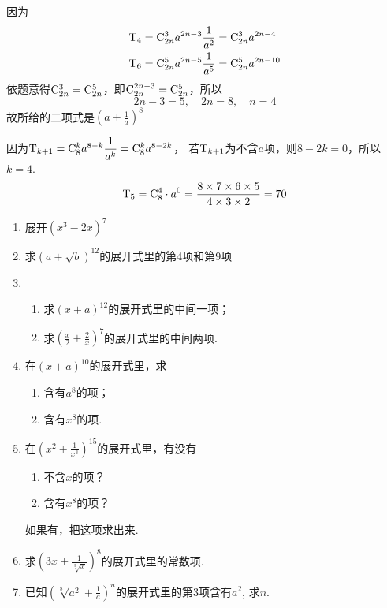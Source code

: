\begin{solution}
因为
\[\begin{split}
    {\rm T}_4&={\rm C}^{3}_{2n}a^{2n-3}\dfrac{1}{a^2}={\rm C}^{3}_{2n}a^{2n-4}\\
    {\rm T}_6&={\rm C}^{5}_{2n}a^{2n-5}\dfrac{1}{a^5}={\rm C}^{5}_{2n}a^{2n-10}
\end{split}\]
依题意得${\rm C}^{3}_{2n}={\rm C}^{5}_{2n}$，即${\rm C}^{2n-3}_{2n}={\rm C}^{5}_{2n}$，所以
\[2n-3=5,\quad 2n=8,\quad n=4\]
故所给的二项式是$\left(a+\frac{1}{a}\right)^8$

因为${\rm T}_{k+1}={\rm C}^{k}_{8}a^{8-k}\dfrac{1}{a^k}={\rm C}^{k}_{8}a^{8-2k}$，
若${\rm T}_{k+1}$为不含$a$项，则$8-2k=0$，所以$k=4$.
\[{\rm T}_5={\rm C}^{4}_{8}\cdot a^0=\dfrac{8\times 7\times 6\times 5}{4\times 3\times 2}=70\]
\end{solution}

\begin{ex}
\begin{enumerate}
    \item 展开$(x^{3}-2x)^{7}$
    \item 求$(a+\sqrt{b})^{12}$的展开式里的第4项和第9项
    \item \begin{enumerate}[(1)]
        \item 求$(x+a)^{12}$的展开式里的中间一项；
        \item 求$\left(\frac x2+\frac2x\right)^7$的展开式里的中间两项.
    \end{enumerate}  
    \item 在$(x+a)^{10}$的展开式里，求
\begin{multicols}{2}
    \begin{enumerate}[(1)]
        \item 含有$a^{8}$的项；
        \item 含有$x^8$的项. 
    \end{enumerate}    
\end{multicols}

    \item 在$\left(x^{2}+\frac{1}{x^3}\right)^{15}$的展开式里，有没有
\begin{multicols}{2}
    \begin{enumerate}
        \item 不含$x$的项？
        \item 含有$x^{8}$的项？
    \end{enumerate}
\end{multicols}
如果有，把这项求出来.
    
\item 求$\left(3x+\frac{1}{\sqrt[3]{x}}\right)^{8}$的展开式里的常数项. 
\item 已知$\left(\sqrt[8]{a^{2}}+\frac1a\right)^{n}$的展开式里的第3项含有$a^2$,    
    求$n$.
\end{enumerate}
\end{ex}

